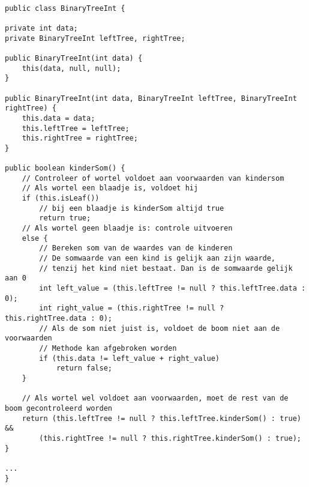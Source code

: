\begin{Oplossing}{4.7}
	\begin{lstlisting}[caption={kinderSom() methode}, label=kinderSom]
	
public class BinaryTreeInt {

private int data;
private BinaryTreeInt leftTree, rightTree;

public BinaryTreeInt(int data) {
	this(data, null, null);
}

public BinaryTreeInt(int data, BinaryTreeInt leftTree, BinaryTreeInt rightTree) {
	this.data = data;
	this.leftTree = leftTree;
	this.rightTree = rightTree;
}
	
public boolean kinderSom() {
	// Controleer of wortel voldoet aan voorwaarden van kindersom
	// Als wortel een blaadje is, voldoet hij
	if (this.isLeaf())
		// bij een blaadje is kinderSom altijd true
		return true;
	// Als wortel geen blaadje is: controle uitvoeren
	else {
		// Bereken som van de waardes van de kinderen
		// De somwaarde van een kind is gelijk aan zijn waarde,
		// tenzij het kind niet bestaat. Dan is de somwaarde gelijk aan 0
		int left_value = (this.leftTree != null ? this.leftTree.data : 0);
		int right_value = (this.rightTree != null ? this.rightTree.data : 0);
		// Als de som niet juist is, voldoet de boom niet aan de voorwaarden
		// Methode kan afgebroken worden
		if (this.data != left_value + right_value)
			return false;
	}
	
	// Als wortel wel voldoet aan voorwaarden, moet de rest van de boom gecontroleerd worden
	return (this.leftTree != null ? this.leftTree.kinderSom() : true) &&
		(this.rightTree != null ? this.rightTree.kinderSom() : true);
}

...
}
	\end{lstlisting}
\end{Oplossing}
